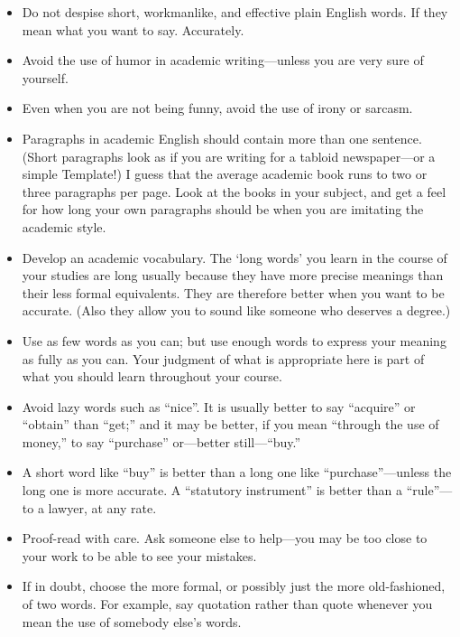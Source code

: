 \begin{itemize}
\item Do not despise short, workmanlike, and effective plain English words. If they mean what you want to say. Accurately.
\item Avoid the use of humor in academic writing---unless you are very sure of yourself.
\item Even when you are not being funny, avoid the use of irony or sarcasm.
\item Paragraphs in academic English should contain more than one sentence. (Short paragraphs look as if you are writing for a tabloid newspaper---or a simple Template!) I guess that the average academic book runs to two or three paragraphs per page. Look at the books in your subject, and get a feel for how long your own paragraphs should be when you are imitating the academic style.
\item Develop an academic vocabulary. The `long words' you learn in the course of your studies are long usually because they have more precise meanings than their less formal equivalents. They are therefore better when you want to be accurate. (Also they allow you to sound like someone who deserves a degree.)
\end{itemize}



\begin{itemize}
\item  Use as few words as you can; but use enough words to express your meaning as fully as you can. Your judgment of what is appropriate here is part of what you should learn throughout your course.
\item  Avoid lazy words such as ``nice''. It is usually better to say ``acquire'' or ``obtain'' than ``get;'' and it may be better, if you mean ``through the use of money,'' to say ``purchase'' or---better still---``buy.''
\item A short word like ``buy'' is better than a long one like ``purchase''---unless the long one is more accurate. A ``statutory instrument'' is better than a ``rule''---to a lawyer, at any rate.
\item Proof-read with care. Ask someone else to help---you may be too close to your work to be able to see your mistakes.
\item If in doubt, choose the more formal, or possibly just the more old-fashioned, of two words. For example, say quotation rather than quote whenever you mean the use of somebody else's words.
\end{itemize}



